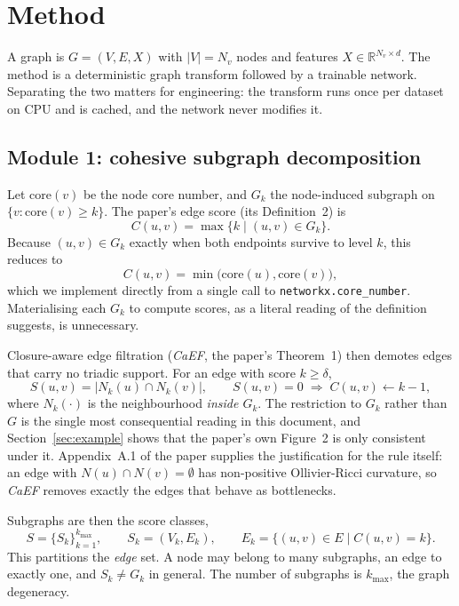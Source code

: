 \documentclass[11pt,a4paper]{article}
\newcommand{\caef}{\textit{CaEF}}
\begin{document}
\section{Method}

A graph is $G = (V, E, X)$ with $|V| = N_v$ nodes and features $X \in \mathbb{R}^{N_v \times d}$.
The method is a deterministic graph transform followed by a trainable network. Separating the two
matters for engineering: the transform runs once per dataset on CPU and is cached, and the network
never modifies it.

\subsection{Module 1: cohesive subgraph decomposition}

Let $\mathrm{core}(v)$ be the node core number, and $G_k$ the node-induced subgraph on
$\{v : \mathrm{core}(v) \geq k\}$. The paper's edge score (its Definition~2) is
\begin{equation}
C(u,v) = \max\{k \mid (u,v) \in G_k\}.
\end{equation}
Because $(u,v) \in G_k$ exactly when both endpoints survive to level $k$, this reduces to
\begin{equation}
C(u,v) = \min\bigl(\mathrm{core}(u), \mathrm{core}(v)\bigr),
\label{eq:score}
\end{equation}
which we implement directly from a single call to \texttt{networkx.core\_number}. Materialising each
$G_k$ to compute scores, as a literal reading of the definition suggests, is unnecessary.

Closure-aware edge filtration (\caef{}, the paper's Theorem~1) then demotes edges that carry no
triadic support. For an edge with score $k \geq \delta$,
\begin{equation}
S(u,v) = \bigl|N_k(u) \cap N_k(v)\bigr|, \qquad
S(u,v) = 0 \;\Longrightarrow\; C(u,v) \leftarrow k - 1,
\label{eq:caef}
\end{equation}
where $N_k(\cdot)$ is the neighbourhood \emph{inside $G_k$}. The restriction to $G_k$ rather than
$G$ is the single most consequential reading in this document, and Section~\ref{sec:example}
shows that the paper's own Figure~2 is only consistent under it. Appendix~A.1 of the paper supplies
the justification for the rule itself: an edge with $N(u) \cap N(v) = \emptyset$ has non-positive
Ollivier-Ricci curvature, so \caef{} removes exactly the edges that behave as bottlenecks.

Subgraphs are then the score classes,
\begin{equation}
S = \{S_k\}_{k=1}^{k_{\max}}, \qquad S_k = (V_k, E_k), \qquad E_k = \{(u,v) \in E \mid C(u,v) = k\}.
\label{eq:partition}
\end{equation}
This partitions the \emph{edge} set. A node may belong to many subgraphs, an edge to exactly one,
and $S_k \neq G_k$ in general. The number of subgraphs is $k_{\max}$, the graph degeneracy.
\end{document}
